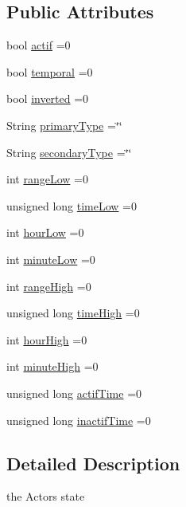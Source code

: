 \subsection*{Public Attributes}
\begin{DoxyCompactItemize}
\item 
bool \hyperlink{struct_jetpack_1_1state_aa177541689bbaea21a4650a083b0df77}{actif} =0
\item 
bool \hyperlink{struct_jetpack_1_1state_abd6039e7a48856550b0ffbf8bcff7bdd}{temporal} =0
\item 
bool \hyperlink{struct_jetpack_1_1state_a6bc03bb8f05b10aa142dbb0c39c87fb5}{inverted} =0
\item 
String \hyperlink{struct_jetpack_1_1state_aa6242c32eb0ab42aaea170636ab949e1}{primary\+Type} =\char`\"{}\char`\"{}
\item 
String \hyperlink{struct_jetpack_1_1state_a81cf9af139da095b7d91e2a87e50135b}{secondary\+Type} =\char`\"{}\char`\"{}
\item 
int \hyperlink{struct_jetpack_1_1state_ad0343b4fd5740c9c1b0876b27f84ace5}{range\+Low} =0
\item 
unsigned long \hyperlink{struct_jetpack_1_1state_ae544475d627308218e355a8dbb28ac74}{time\+Low} =0
\item 
int \hyperlink{struct_jetpack_1_1state_a9bd1b9e85800cfbec989ce40d1e9e08a}{hour\+Low} =0
\item 
int \hyperlink{struct_jetpack_1_1state_aa699e25d802a00e86d3a8032ec48b88b}{minute\+Low} =0
\item 
int \hyperlink{struct_jetpack_1_1state_ae330612c3da637654ecfa89d36620b93}{range\+High} =0
\item 
unsigned long \hyperlink{struct_jetpack_1_1state_a97c594b20b03b46ae0a6ac544f5d6c8d}{time\+High} =0
\item 
int \hyperlink{struct_jetpack_1_1state_ace824f4ae57fa1a4a27b2c6477b350e3}{hour\+High} =0
\item 
int \hyperlink{struct_jetpack_1_1state_a8c26c18b0ec449b7545934cb01cca028}{minute\+High} =0
\item 
unsigned long \hyperlink{struct_jetpack_1_1state_af2e1cc323ef9ffcc3cf4d203f85d726b}{actif\+Time} =0
\item 
unsigned long \hyperlink{struct_jetpack_1_1state_aaf817b1f9e7a4d65b9e3ca4726b281f6}{inactif\+Time} =0
\end{DoxyCompactItemize}


\subsection{Detailed Description}
the Actor\textquotesingle{}s state 

